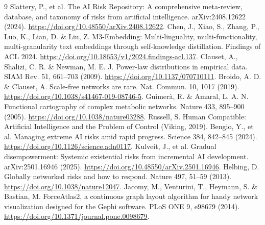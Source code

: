 \documentclass[11pt,a4paper]{article}
\begin{document}
\begin{thebibliography}{9}
 Slattery, P., et al. The AI Risk Repository: A comprehensive meta-review, database, and taxonomy of risks from artificial intelligence. arXiv:2408.12622 (2024). \url{https://doi.org/10.48550/arXiv.2408.12622}.
 Chen, J., Xiao, S., Zhang, P., Luo, K., Lian, D. \& Liu, Z. M3-Embedding: Multi-linguality, multi-functionality, multi-granularity text embeddings through self-knowledge distillation. Findings of ACL 2024. \url{https://doi.org/10.18653/v1/2024.findings-acl.137}.
 Clauset, A., Shalizi, C. R. \& Newman, M. E. J. Power-law distributions in empirical data. SIAM Rev. 51, 661--703 (2009). \url{https://doi.org/10.1137/070710111}.
 Broido, A. D. \& Clauset, A. Scale-free networks are rare. Nat. Commun. 10, 1017 (2019). \url{https://doi.org/10.1038/s41467-019-08746-5}.
 Guimer\`a, R. \& Amaral, L. A. N. Functional cartography of complex metabolic networks. Nature 433, 895--900 (2005). \url{https://doi.org/10.1038/nature03288}.
 Russell, S. Human Compatible: Artificial Intelligence and the Problem of Control (Viking, 2019).
 Bengio, Y., et al. Managing extreme AI risks amid rapid progress. Science 384, 842--845 (2024). \url{https://doi.org/10.1126/science.adn0117}.
 Kulveit, J., et al. Gradual disempowerment: Systemic existential risks from incremental AI development. arXiv:2501.16946 (2025). \url{https://doi.org/10.48550/arXiv.2501.16946}.
 Helbing, D. Globally networked risks and how to respond. Nature 497, 51--59 (2013). \url{https://doi.org/10.1038/nature12047}.
 Jacomy, M., Venturini, T., Heymann, S. \& Bastian, M. ForceAtlas2, a continuous graph layout algorithm for handy network visualization designed for the Gephi software. PLoS ONE 9, e98679 (2014). \url{https://doi.org/10.1371/journal.pone.0098679}.
\end{thebibliography}
\end{document}
